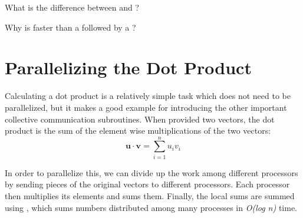 









\begin{problem}
What is the difference between  and ?
\end{problem}

\begin{problem}
Why is  faster than a  followed by a ?
\end{problem}



\section*{Parallelizing the Dot Product}
Calculating a dot product is a relatively simple task which does not need to be parallelized, but it makes a good example for introducing the other important collective communication subroutines. When provided two vectors, the dot product is the sum of the element wise multiplications of the two vectors:
\[
\textbf{u} \cdot \textbf{v} = \sum_{i=1}^{n} u_i v_i
\]

In order to parallelize this, we can divide up the work among different processors by sending pieces of the original vectors to different processors. Each processor then multiplies its elements and sums them. Finally, the local sums are summed using , which sums numbers distributed among many processes in \emph{O(log n)} time.

